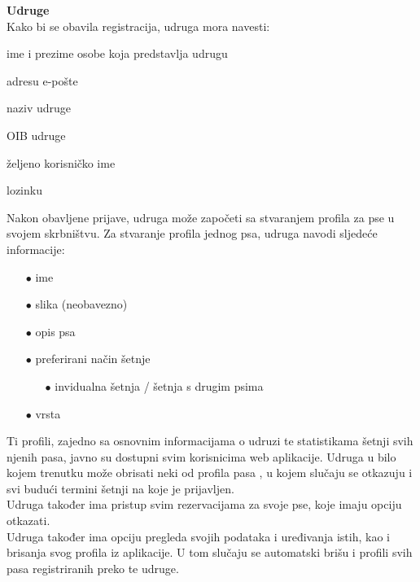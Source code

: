 \begin{packed_item}
            \item[2)] \textbf{Udruge} \\
                Kako bi se obavila registracija, udruga mora navesti:
                \begin{packed_item}
                    \item[$\bullet$] ime i prezime osobe koja predstavlja udrugu
                    \item[$\bullet$] adresu e-pošte
                    \item[$\bullet$] naziv udruge
                    \item[$\bullet$] OIB udruge
                    \item[$\bullet$] željeno korisničko ime
                    \item[$\bullet$] lozinku
                \end{packed_item}
                Nakon obavljene prijave, udruga može započeti sa stvaranjem profila za pse u svojem skrbništvu.
                \newline
                Za stvaranje profila jednog psa, udruga navodi sljedeće informacije:
                \begin{enumerate}
                    \item[$\bullet$] ime
                    \item[$\bullet$] slika (neobavezno)
                    \item[$\bullet$] opis psa
                    \item[$\bullet$] preferirani način šetnje
                        \begin{enumerate}
                            \item[$\bullet$] invidualna šetnja / šetnja s drugim psima
                        \end{enumerate}
                    \item[$\bullet$] vrsta
                \end{enumerate}
                Ti profili, zajedno sa osnovnim informacijama o udruzi te statistikama šetnji svih njenih pasa, javno su dostupni svim korisnicima web aplikacije. Udruga u bilo kojem trenutku može obrisati neki od profila pasa , u kojem slučaju se otkazuju i svi budući termini šetnji na koje je prijavljen. \newline \\
                Udruga također ima pristup svim rezervacijama za svoje pse, koje imaju opciju otkazati. \newline \\
                Udruga također ima opciju pregleda svojih podataka i uređivanja istih, kao i brisanja svog profila iz aplikacije. U tom slučaju se automatski brišu i profili svih pasa registriranih preko te udruge.
        \end{packed_item}

